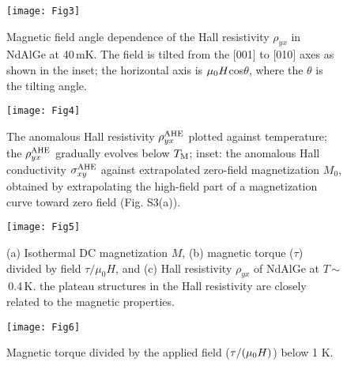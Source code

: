 \documentclass[%
preprint,
 amsmath,amssymb,
 aps,
]{revtex4-2}
\begin{document}
\begin{figure}
\texttt{[image: Fig3]}%
\caption{
Magnetic field angle dependence of the Hall resistivity $\rho_{yx}$ in NdAlGe at 40\,mK. 
The field is tilted from the $\lbrack$001$\rbrack$ to $\lbrack$010$\rbrack$ axes as shown in the inset; 
the horizontal axis is $\mu_{\rm 0}H$cos$\theta$, where the $\theta$ is the tilting angle.
}
\end{figure}

\begin{figure}
\texttt{[image: Fig4]}%
\caption{
The anomalous Hall resistivity $\rho_{yx}^{\rm AHE}$ plotted against temperature; 
the $\rho_{yx}^{\rm AHE}$ gradually evolves below $T_{\rm M}$; 
inset: 
the anomalous Hall conductivity $\sigma_{xy}^{\rm AHE}$ against 
extrapolated zero-field magnetization $M_{0}$, 
obtained by extrapolating the high-field part of a magnetization curve toward zero field (Fig. S3(a)). 
}
\end{figure}

\begin{figure}
\texttt{[image: Fig5]}%
\caption{
(a) Isothermal DC magnetization $M$, (b) magnetic torque ($\tau$) divided by field $\tau /\mu_{0}H$, 
and (c) Hall resistivity $\rho_{yx}$ of NdAlGe at $T$\,$\sim$\,0.4\,K. 
the plateau structures in the Hall resistivity are closely related to the magnetic properties. 
}
\end{figure}

\begin{figure}
\texttt{[image: Fig6]}%
\caption{
Magnetic torque divided by the applied field ($\tau /(\mu_{\rm 0}H)$) below 1 K. 
}
\end{figure}
\end{document}
